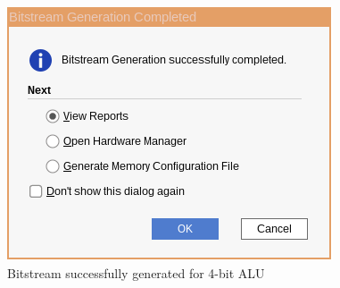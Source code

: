 \documentclass[CMPE]{../KGCOEReport}
\begin{document}
    \begin{figure}[h!]
        \centering
        \includegraphics[width=\textwidth/2]{img/bitstream_successful}
        \caption{Bitstream successfully generated for 4-bit ALU}
        \label{fig:demo1}
	\end{figure}
\end{document}
